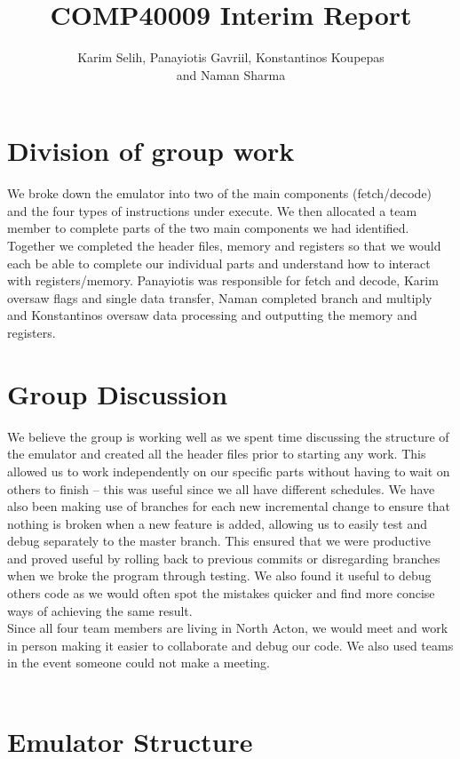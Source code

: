\documentclass{article}
\title{COMP40009 Interim Report}
\author{Karim Selih, Panayiotis Gavriil, Konstantinos Koupepas \\ and Naman Sharma}
\date{}
\begin{document}
\maketitle

\section*{Division of group work}

We broke down the emulator into two of the main components (fetch/decode) and the four types of instructions under execute. We then allocated a team member to complete parts of the two main components we had identified. Together we completed the header files, memory and registers so that we would each be able to complete our individual parts and understand how to interact with registers/memory. Panayiotis was responsible for fetch and decode, Karim oversaw flags and single data transfer, Naman completed branch and multiply and Konstantinos oversaw data processing and outputting the memory and registers.  

\section*{Group Discussion}

We believe the group is working well as we spent time discussing the structure of the emulator and created all the header files prior to starting any work. This allowed us to work independently on our specific parts without having to wait on others to finish – this was useful since we all have different schedules. We have also been making use of branches for each new incremental change to ensure that nothing is broken when a new feature is added, allowing us to easily test and debug separately to the master branch. This ensured that we were productive and proved useful by rolling back to previous commits or disregarding branches when we broke the program through testing. We also found it useful to debug others code as we would often spot the mistakes quicker and find more concise ways of achieving the same result.\\ 

\noindent Since all four team members are living in North Acton, we would meet and work in person making it easier to collaborate and debug our code. We also used teams in the event someone could not make a meeting. \\ \\

\section*{Emulator Structure}
\end{document}
